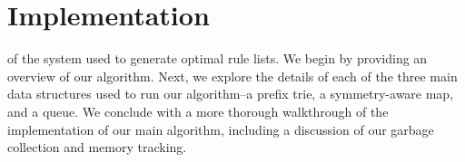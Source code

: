 \chapter{Implementation}





 of the system used to generate optimal rule lists.
We begin by providing an overview of our algorithm.
Next, we explore the details of each of the three main data structures used to run our algorithm--a prefix trie, a symmetry-aware map, and a queue. 
We conclude with a more thorough walkthrough of the implementation of our main algorithm, including a discussion of our garbage collection and memory tracking.

